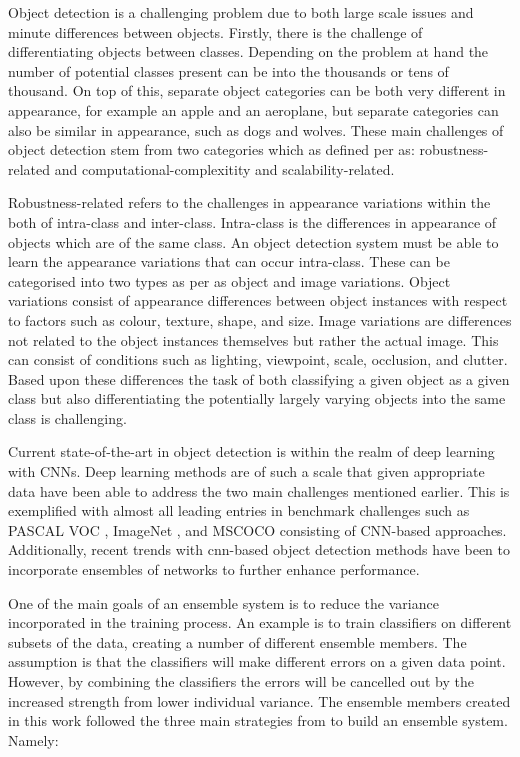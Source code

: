 \documentclass[a4paper,twoside]{article}
\begin{document}
Object detection is a challenging problem due to both large scale issues and minute differences between objects. Firstly, there is the challenge of differentiating objects between classes. Depending on the problem at hand the number of potential classes present can be into the thousands or tens of thousand. On top of this, separate object categories can be both very different in appearance, for example an apple and an aeroplane, but separate categories can also be similar in appearance, such as dogs and wolves. These main challenges of object detection stem from two categories which as defined per \cite{zhang} as: robustness-related and computational-complexitity and scalability-related.

Robustness-related refers to the challenges in appearance variations within the both of intra-class and inter-class. Intra-class is the differences in appearance of objects which are of the same class. An object detection system must be able to learn the appearance variations that can occur intra-class. These can be categorised into two types as per \cite{schroff} as object and image variations. Object variations consist of appearance differences between object instances with respect to factors such as colour, texture, shape, and size. Image variations are differences not related to the object instances themselves but rather the actual image. This can consist of conditions such as lighting, viewpoint, scale, occlusion, and clutter. Based upon these differences the task of both classifying a given object as a given class but also differentiating the potentially largely varying objects into the same class is challenging.

Current state-of-the-art in object detection is within the realm of deep learning with CNNs. Deep learning methods are of such a scale that given appropriate data have been able to address the two main challenges mentioned earlier. This is exemplified with almost all leading entries in benchmark challenges such as PASCAL VOC \cite{pascalvoc2010}, ImageNet \cite{imagenet}, and MSCOCO \cite{mscoco} consisting of CNN-based approaches. Additionally, recent trends with \gls{cnn}-based object detection methods have been to incorporate ensembles of networks to further enhance performance. 


One of the main goals of an ensemble system is to reduce the variance incorporated in the training process. An example is to train classifiers on different subsets of the data, creating a number of different ensemble members. The assumption is that the classifiers will make different errors on a given data point. However, by combining the classifiers the errors will be cancelled out by the increased strength from lower individual variance. The ensemble members created in this work followed the three main strategies from \cite{ensemblebook} to build an ensemble system. Namely:
\end{document}
